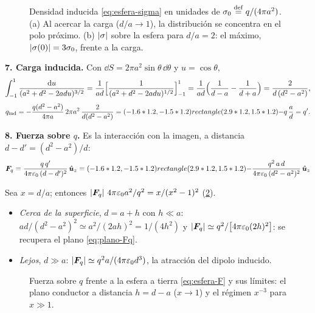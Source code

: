 \documentclass[11pt,a4paper,twoside]{article}
\begin{document}
\begin{resolucion}
\begin{figure}[!htb]
  \centering
  
  \caption{Densidad inducida \eqref{eq:esfera-sigma} en unidades de
  $\sigma_0\mathrel{\overset{\mathrm{def}}{=}} q/(4\pi a^{2})$. (a) Al acercar la carga ($d/a\to1$), la distribución se
  concentra en el polo próximo. (b) $\left\lvert \sigma\right\rvert$ sobre la esfera para $d/a=2$: el
  máximo, $\left\lvert \sigma(0)\right\rvert=3\sigma_0$, frente a la carga.}
  \label{fig:esfera-sigma}
\end{figure}

\textbf{7. Carga inducida.} Con $\dd S=2\pi a^{2}\sin\theta\,\dd\theta$ y $u=\cos\theta$,
\[
  \int_{-1}^{1}\frac{\mathrm{d} u}{(a^{2}+d^{2}-2adu)^{3/2}}
  =\frac{1}{ad}\Bigl[\frac{1}{(a^{2}+d^{2}-2adu)^{1/2}}\Bigr]_{-1}^{1}
  =\frac{1}{ad}\Bigl(\frac{1}{d-a}-\frac{1}{d+a}\Bigr)=\frac{2}{d\,(d^{2}-a^{2})},
\]
\begin{equation}\label{eq:esfera-qind}
  q_{\mathrm{ind}}=-\frac{q(d^{2}-a^{2})}{4\pi a}\,2\pi a^{2}\,\frac{2}{d(d^{2}-a^{2})}=(-1.6*1.2,-1.5*1.2) rectangle (2.9*1.2,1.5*1.2){-q\,\frac ad=q'.}
\end{equation}

\textbf{8. Fuerza sobre $q$.} Es la interacción con la imagen, a distancia
$d-d'=(d^{2}-a^{2})/d$:
\begin{equation}\label{eq:esfera-F}
  \bm{F}_q=\frac{q\,q'}{4\pi\varepsilon_{0}\,(d-d')^{2}}\,\hat{\bm{u}}_z
  =(-1.6*1.2,-1.5*1.2) rectangle (2.9*1.2,1.5*1.2){-\frac{q^{2}\,a\,d}{4\pi\varepsilon_{0}\,(d^{2}-a^{2})^{2}}\,\hat{\bm{u}}_z}
\end{equation}
\end{resolucion}



\begin{observacion}
Sea $x=d/a$; entonces $\left\lvert \bm{F}_q\right\rvert\,4\pi\varepsilon_{0} a^{2}/q^{2}=x/(x^{2}-1)^{2}$
(\cref{fig:esfera-fuerza}).
\begin{itemize}
  \item \emph{Cerca de la superficie}, $d=a+h$ con $h\ll a$:
  $ad/(d^{2}-a^{2})^{2}\simeq a^{2}/(2ah)^{2}=1/(4h^{2})$ y
  $\left\lvert \bm{F}_q\right\rvert\simeq q^{2}/\bigl[4\pi\varepsilon_{0}(2h)^{2}\bigr]$: se recupera el plano \eqref{eq:plano-Fq}.
  \item \emph{Lejos}, $d\gg a$: $\left\lvert \bm{F}_q\right\rvert\simeq q^{2}a/(4\pi\varepsilon_{0} d^{3})$, la atracción del
  dipolo inducido.
\end{itemize}
\end{observacion}

\begin{figure}[!htb]
  \centering
  
  \caption{Fuerza sobre $q$ frente a la esfera a tierra \eqref{eq:esfera-F} y sus límites: el
  plano conductor a distancia $h=d-a$ ($x\to1$) y el régimen $x^{-3}$ para $x\gg1$.}
  \label{fig:esfera-fuerza}
\end{figure}
\end{document}
